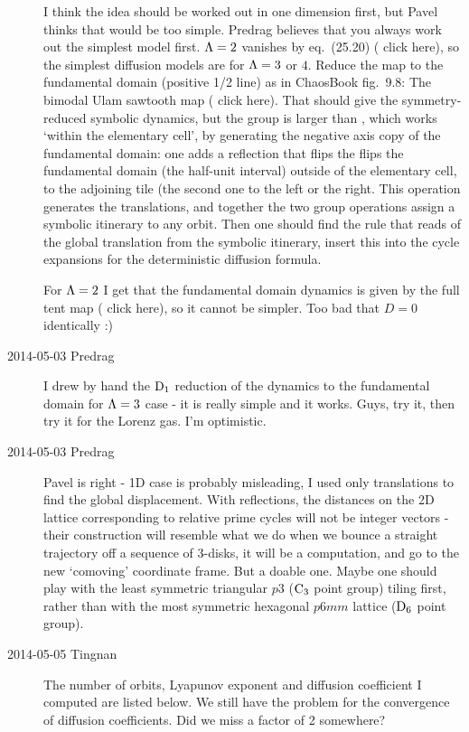 \documentclass[pre,preprint,groupedaddress,showpacs,showkeys]{revtex4}
\begin{document}
\begin{description}
I think the idea should be worked out in one dimension first, but Pavel
thinks that would be too simple. Predrag believes that you always work
out the simplest model first. $\Lambda =2$ vanishes by eq.~(25.20)
( {click
here}), so the simplest diffusion models are for $\Lambda =3$ or $4$.
Reduce the map to the fundamental domain (positive 1/2 line) as in
ChaosBook fig.~9.8: The bimodal Ulam sawtooth map
( {click
here}). That should give the symmetry-reduced symbolic dynamics, but the
group is larger than , which works `within the elementary cell', by
generating the negative axis copy of the fundamental domain: one adds a
reflection that flips the flips the fundamental domain (the half-unit
interval) outside of the elementary cell, to the adjoining tile (the
second one to the left or the right. This operation generates the
translations, and together the two group operations assign a symbolic
itinerary to any orbit. Then one should find the rule that reads of the
global translation from the symbolic itinerary, insert this into the
cycle expansions for the deterministic diffusion formula.

For $\Lambda =2$ I get that the fundamental domain dynamics is given by
the full tent map
( {click
here}), so it cannot be simpler. Too bad that $D=0$ identically :)

\item[2014-05-03 Predrag] I drew by hand the $\textrm{D}_{1}$ reduction of the
dynamics to the fundamental domain for $\Lambda =3$ case - it is really
simple and it works. Guys, try it, then try it for the Lorenz gas. I'm
optimistic.

\item[2014-05-03 Predrag] Pavel is right - 1D case is probably
misleading, I used only translations to find the global displacement.
With reflections, the distances on the 2D lattice corresponding to
relative prime cycles will not be integer vectors - their construction
will resemble what we do when we bounce a straight trajectory off a
sequence of 3-disks, it will be a computation, and go to the new
`comoving' coordinate frame. But a doable one. Maybe one should play with
the least symmetric triangular $p3$ ($\textrm{C}_{3}$ point group) tiling first,
rather than with the most symmetric hexagonal $p6mm$ lattice ($\textrm{D}_{6}$
point group).

\item[2014-05-05 Tingnan] The number of orbits, Lyapunov exponent and diffusion coefficient I computed are listed below. We still have the problem for the convergence of diffusion coefficients. Did we miss a factor of 2 somewhere?


\end{description}
\end{document}
